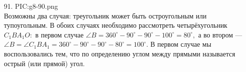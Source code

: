 91. {{PIC:g8-90.png}}\\
Возможны два случая: треугольник может быть остроугольным или тупоугольным. В обоих случаях необходимо рассмотреть четырёхугольник $C_1BA_1O:$ в первом случае $\angle B =360^\circ-90^\circ-90^\circ-100^\circ=80^\circ,$ а во втором --- $\angle B=\angle C_1BA_1=360^\circ-90^\circ-90^\circ-80^\circ=100^\circ.$ В первом случае мы воспользовались тем, что по определению углом между прямыми называется острый (или прямой) угол.\\
